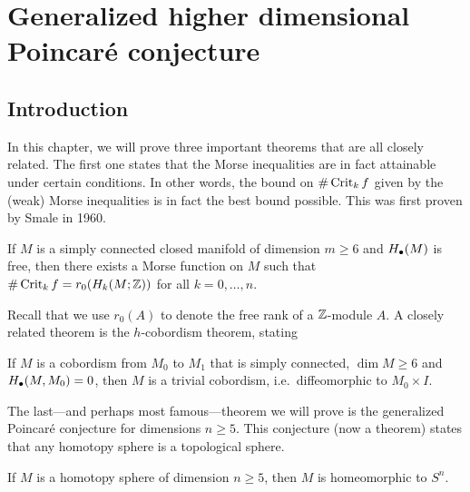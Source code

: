 \chapter[Generalized Poincaré conjecture]{Generalized higher dimensional Poincaré conjecture}
\label{chap:h-cobord}
\section{Introduction}

In this chapter, we will prove three important theorems that are all closely related.
The first one states that the Morse inequalities are in fact attainable under certain conditions.
In other words, the bound on $\# \operatorname{Crit}_k f$ given by the (weak) Morse inequalities is in fact the best bound possible. This was first proven by Smale in 1960.
\begin{theorem}
    If $M$ is a simply connected closed manifold of dimension  $m \ge  6$ and $H_\bullet(M)$ is free, then there exists a Morse function on  $M$ such that  $\# \operatorname{Crit}_k f = r_0(H_k(M; \mathbb{Z}))$ for all $k = 0, \ldots, n$.
\end{theorem}
Recall that we use $r_0(A)$ to denote the free rank of a $\mathbb{Z}$-module $A$.
A closely related theorem is the $h$-cobordism theorem, stating
\begin{theorem}
    If $M$ is a cobordism from $M_0$ to $M_1$ that is simply connected, $\dim M \ge 6$ and $H_{\bullet}(M,M_0) = 0$, then $M$ is a trivial cobordism, i.e.\ diffeomorphic to  $ M_0 \times I$.
\end{theorem}
The last---and perhaps most famous---theorem we will prove is the generalized Poincaré conjecture for dimensions $n \ge 5$.
This conjecture (now a theorem) states that any homotopy sphere is a topological sphere.
\begin{theorem}
    If $M$ is a homotopy sphere of dimension  $n \ge 5$, then $M$ is homeomorphic to  $S^{n}$.
\end{theorem}

